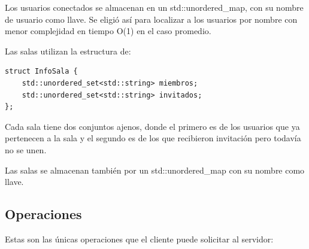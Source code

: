 \documentclass[12pt,letterpaper]{article}
\begin{document}
Los usuarios conectados se almacenan en un
std::unordered\_map, con su nombre de usuario como llave.
Se eligió así para localizar a los usuarios por nombre con menor complejidad en tiempo O(1) en el caso promedio.

Las salas utilizan la estructura de:
\begin{lstlisting}[style=cppstyle]
struct InfoSala {
    std::unordered_set<std::string> miembros;
    std::unordered_set<std::string> invitados;
};
\end{lstlisting}

Cada sala tiene dos conjuntos ajenos, donde el primero es de
los usuarios que ya pertenecen a la sala y el segundo es de
los que recibieron invitación pero todavía no se unen.

Las salas se almacenan también por un
std::unordered\_map con su nombre como llave.

\subsection{Operaciones}

Estas son las únicas operaciones que el cliente puede solicitar al servidor:
\end{document}
